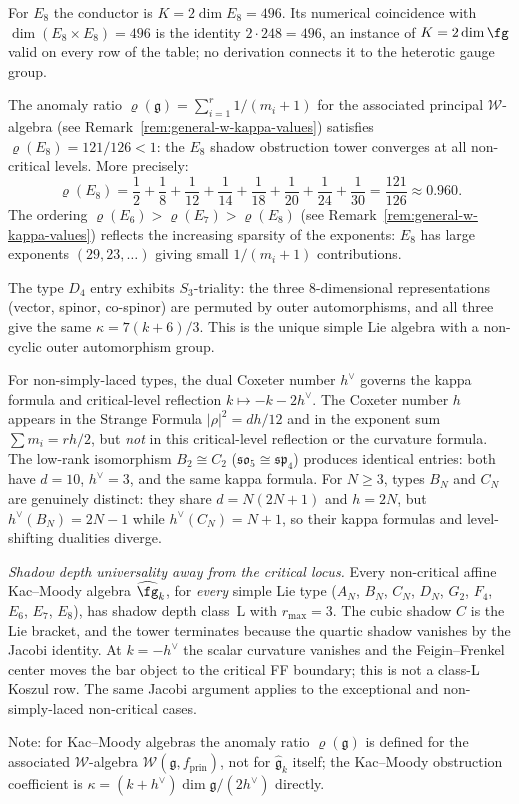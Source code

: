 \begin{remark}
For $E_8$ the conductor is $K = 2\dim E_8 = 496$.  Its numerical coincidence with $\dim(E_8\times E_8) = 496$ is the identity $2\cdot248 = 496$, an instance of $K = 2\dim\fg$ valid on every row of the table; no derivation connects it to the heterotic gauge group.

The anomaly ratio $\varrho(\mathfrak{g}) = \sum_{i=1}^r 1/(m_i+1)$ for the associated principal $\mathcal{W}$-algebra (see Remark~\ref{rem:general-w-kappa-values}) satisfies $\varrho(E_8) = 121/126 < 1$: the $E_8$ shadow obstruction tower converges at all non-critical levels. More precisely:
\[
\varrho(E_8) = \frac{1}{2} + \frac{1}{8} + \frac{1}{12} + \frac{1}{14} + \frac{1}{18} + \frac{1}{20} + \frac{1}{24} + \frac{1}{30} = \frac{121}{126} \approx 0.960.
\]
The ordering $\varrho(E_6) > \varrho(E_7) > \varrho(E_8)$ (see Remark~\ref{rem:general-w-kappa-values}) reflects the increasing sparsity of the exponents: $E_8$ has large exponents $(29, 23, \ldots)$ giving small $1/(m_i + 1)$ contributions.

The type $D_4$ entry exhibits $S_3$-triality: the three
$8$-dimensional representations (vector, spinor, co-spinor) are
permuted by outer automorphisms, and all three give the same
$\kappa = 7(k+6)/3$. This is the unique simple Lie algebra with a
non-cyclic outer automorphism group.

For non-simply-laced types, the dual Coxeter number $h^\vee$ governs the kappa formula and critical-level reflection \(k \mapsto -k - 2h^\vee\). The Coxeter number $h$ appears in the Strange Formula $\lvert\rho\rvert^2 = dh/12$ and in the exponent sum $\sum m_i = rh/2$, but \emph{not} in this critical-level reflection or the curvature formula. The low-rank isomorphism $B_2 \cong C_2$ ($\mathfrak{so}_5 \cong \mathfrak{sp}_4$) produces identical entries: both have $d = 10$, $h^\vee = 3$, and the same kappa formula. For $N \geq 3$, types $B_N$ and $C_N$ are genuinely distinct: they share $d = N(2N+1)$ and $h = 2N$, but $h^\vee(B_N) = 2N-1$ while $h^\vee(C_N) = N+1$, so their kappa formulas and level-shifting dualities diverge.

\emph{Shadow depth universality away from the critical locus.} Every
non-critical affine Kac--Moody algebra $\widehat{\fg}_k$,
for \emph{every} simple Lie type ($A_N$, $B_N$, $C_N$, $D_N$, $G_2$,
$F_4$, $E_6$, $E_7$, $E_8$), has shadow depth class~L with
$r_{\max} = 3$. The cubic shadow $C$ is the Lie bracket, and the tower
terminates because the quartic shadow vanishes by the Jacobi identity.
At $k=-h^\vee$ the scalar curvature vanishes and the Feigin--Frenkel
center moves the bar object to the critical FF boundary; this is not a
class-L Koszul row. The same Jacobi argument applies to the exceptional
and non-simply-laced non-critical cases.

Note: for Kac--Moody algebras the anomaly ratio $\varrho(\mathfrak{g})$ is defined for the associated $\mathcal{W}$-algebra $\mathcal{W}(\mathfrak{g}, f_{\mathrm{prin}})$, not for $\widehat{\mathfrak{g}}_k$ itself; the Kac--Moody obstruction coefficient is $\kappa = (k+h^\vee)\dim\mathfrak{g}/(2h^\vee)$ directly.
\end{remark}

